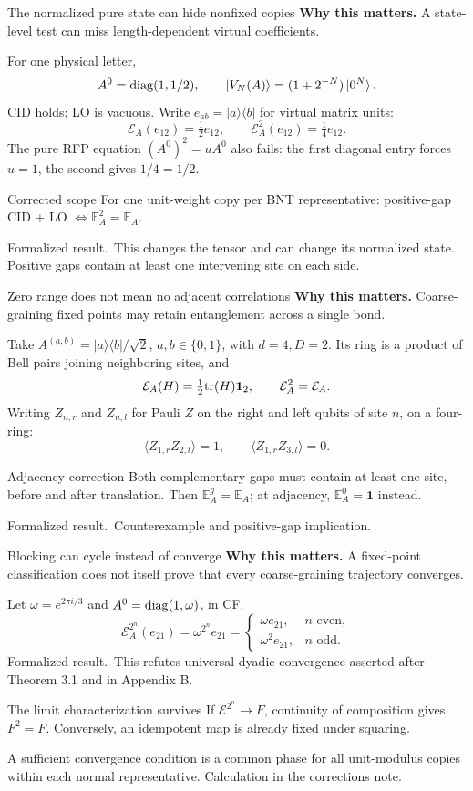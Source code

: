 \documentclass[aspectratio=169,14pt]{beamer}
\newcommand{\E}{\mathcal E}
\newcommand{\Id}{\mathbf 1}
\newcommand{\kb}[2]{\lvert#1\rangle\langle#2\rvert}
\newcommand{\why}[1]{\textcolor{amber}{\textbf{Why this matters.}} #1\par\medskip}
\newcommand{\verified}{\textcolor{mintgreen}{Formalized result.}}
\newcommand{\calculated}{\textcolor{amber}{Calculation in the corrections note.}}
\begin{document}
\begin{frame}{The normalized pure state can hide nonfixed copies}
\why{A state-level test can miss length-dependent virtual coefficients.}
For one physical letter,
\[
 A^0=\mathrm{diag}(1,1/2),\qquad \ket{V_N(A)}=(1+2^{-N})\ket{0^N}.
\]
CID holds; LO is vacuous. Write $e_{ab}=\kb{a}{b}$ for virtual matrix units:
\[
 \E_A(e_{12})=\tfrac12e_{12},\qquad \E_A^2(e_{12})=\tfrac14e_{12}.
\]
The pure RFP equation $(A^0)^2=uA^0$ also fails: the first diagonal entry forces $u=1$, the second gives $1/4=1/2$.
\begin{block}{Corrected scope}
For one unit-weight copy per BNT representative: positive-gap CID + LO $\Longleftrightarrow\mathbb E_A^2=\mathbb E_A$.
\end{block}
\verified\ This changes the tensor and can change its normalized state. Positive gaps contain at least one intervening site on each side.
\end{frame}
\begin{frame}{Zero range does not mean no adjacent correlations}
\why{Coarse-graining fixed points may retain entanglement across a single bond.}
Take $A^{(a,b)}=\kb{a}{b}/\sqrt2$, $a,b\in\{0,1\}$, with $d=4,D=2$.
Its ring is a product of Bell pairs joining neighboring sites, and
\[
 \E_A(H)=\tfrac12\tr(H)\Id_2,\qquad \E_A^2=\E_A.
\]
Writing $Z_{n,r}$ and $Z_{n,l}$ for Pauli $Z$ on the right and left qubits of site $n$, on a four-ring:
\[
 \langle Z_{1,r}Z_{2,l}\rangle=1,\qquad
 \langle Z_{1,r}Z_{3,l}\rangle=0.
\]
\begin{block}{Adjacency correction}
Both complementary gaps must contain at least one site, before and after translation. Then $\mathbb E_A^g=\mathbb E_A$; at adjacency, $\mathbb E_A^0=\Id$ instead.
\end{block}
\verified\ Counterexample and positive-gap implication.
\end{frame}
\begin{frame}{Blocking can cycle instead of converge}
\why{A fixed-point classification does not itself prove that every coarse-graining trajectory converges.}
Let $\omega=e^{2\pi i/3}$ and $A^0=\mathrm{diag}(1,\omega)$, in CF.
\[
 \E_A^{2^n}(e_{21})=\omega^{2^n}e_{21}
 =\begin{cases}\omega e_{21},&n\text{ even},\\\omega^2e_{21},&n\text{ odd}.\end{cases}
\]
\verified\ This refutes universal dyadic convergence asserted after Theorem 3.1 and in Appendix B.
\begin{block}{The limit characterization survives}
If $\E^{2^n}\to F$, continuity of composition gives $F^2=F$.
Conversely, an idempotent map is already fixed under squaring.
\end{block}
A sufficient convergence condition is a common phase for all unit-modulus copies within each normal representative. \calculated
\end{frame}
\end{document}
